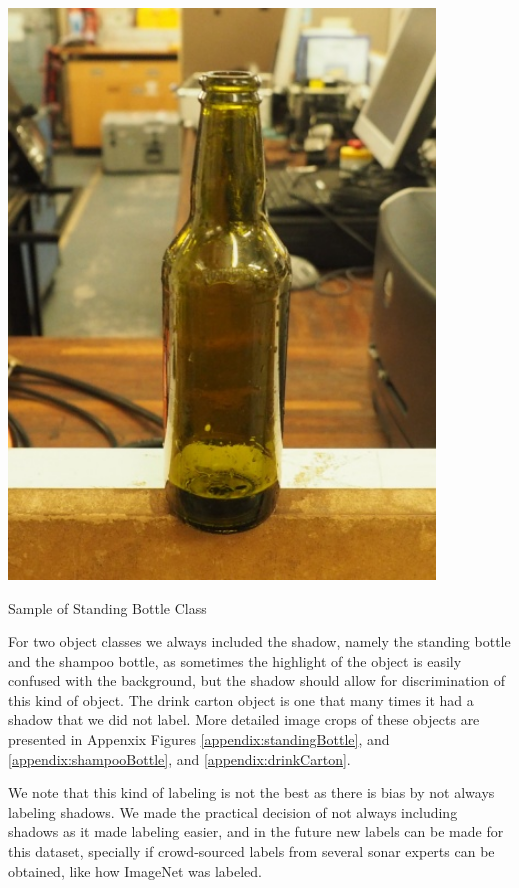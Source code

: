 \begin{marginfigure}
    \centering
    \includegraphics[width = 0.85\textwidth]{chapters/images/dataset/beer-bottle.jpg}
    \caption{Sample of Standing Bottle Class}
    \label{md:standing-bottle}
\end{marginfigure}


For two object classes we always included the shadow, namely the standing bottle and the shampoo bottle, as sometimes the highlight of the object is easily confused with the background, but the shadow should allow for discrimination of this kind of object. The drink carton object is one that many times it had a shadow that we did not label. More detailed image crops of these objects are presented in Appenxix Figures \ref{appendix:standingBottle}, and \ref{appendix:shampooBottle}, and \ref{appendix:drinkCarton}.

We note that this kind of labeling is not the best as there is bias by not always labeling shadows. We made the practical decision of not always including shadows as it made labeling easier, and in the future new labels can be made for this dataset, specially if crowd-sourced labels from several sonar experts can be obtained, like how ImageNet\cite[-5em]{russakovsky2015imagenet} was labeled.

